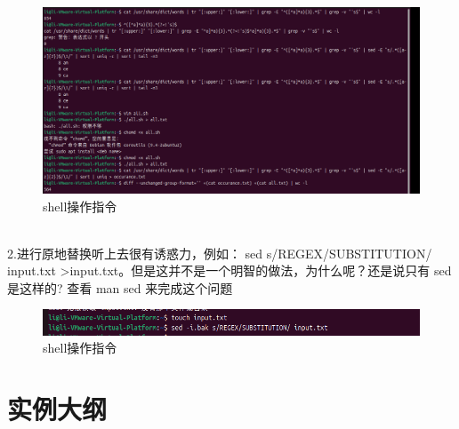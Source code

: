 \documentclass[a4paper, 12pt]{article}
\begin{document}
\begin{figure}[H]
  \centering
  \includegraphics[width=1\textwidth]{屏幕截图 2024-09-05 235050.png}
  \caption{shell操作指令}
    \end{figure} 
\\
2.进行原地替换听上去很有诱惑力，例如： sed s/REGEX/SUBSTITUTION/ input.txt  >input.txt。但是这并不是一个明智的做法，为什么呢？还是说只有 sed 是这样的? 查看 man sed 来完成这个问题
\begin{figure}[H]
  \centering
  \includegraphics[width=1\textwidth]{屏幕截图 2024-09-05 235124.png}
  \caption{shell操作指令}
    \end{figure} 




\section{实例大纲}
\end{document}
